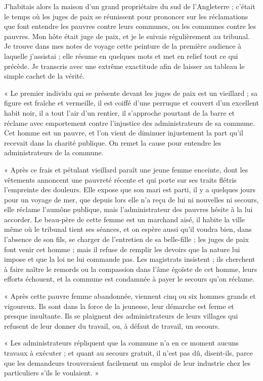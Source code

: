 \documentclass[french,twoside]{book} %
\newenvironment{quoteblock}%
  {\begin{quoting}}
  {\end{quoting}}
\newenvironment{quotebar}{%
    \def\FrameCommand{{\color{rubric!10!}\vrule width 0.5em} \hspace{0.9em}}%
    \def\OuterFrameSep{\itemsep} %
    \MakeFramed {\advance\hsize-\width \FrameRestore}
  }%
  {%
    \endMakeFramed
  }
\renewenvironment{quoteblock}%
  {%
    \savenotes
    \setstretch{0.9}
    \begin{quotebar}
  }
  {%
    \end{quotebar}
    \spewnotes
  }
\begin{document}
J'habitais alors la maison d’un grand propriétaire du sud de l’Angleterre ; c’était le temps où les juges de paix se réunissent pour prononcer sur les réclamations que font entendre les pauvres contre leurs communes, ou les communes contre les pauvres. Mon hôte était juge de paix, et je le suivais régulièrement au tribunal. Je trouve dans mes notes de voyage cette peinture de la première audience à laquelle j’assistai ; elle résume en quelques mots et met en relief tout ce qui précède. Je transcris avec une extrême exactitude afin de laisser au tableau le simple cachet de la vérité.\par

\begin{quoteblock}
\noindent « Le premier individu qui se présente devant les juges de paix est un vieillard ; sa figure est fraîche et vermeille, il est coiffé d’une perruque et couvert d’un excellent habit noir, il a tout l’air d’un rentier, il s’approche pourtant de la barre et réclame avec emportement contre l’injustice des administrateurs de sa commune. Cet homme est un pauvre, et l’on vient de diminuer injustement la part qu’il recevait dans la charité publique. On remet la cause pour entendre les administrateurs de la commune.\par
« Après ce frais et pétulant vieillard paraît une jeune femme enceinte, dont les vêtements annoncent une pauvreté récente et qui porte sur ses traits flétris l’empreinte des douleurs. Elle expose que son mari est parti, il y a quelques jours pour un voyage de mer, que depuis lors elle n’a reçu de lui ni nouvelles ni secours, elle réclame l’aumône publique, mais l’administrateur des pauvres hésite à la lui accorder. Le beau-père de cette femme est un marchand aisé, il habite la ville même où le tribunal tient ses séances, et on espère aussi qu’il voudra bien, dans l’absence de son fils, se charger de l’entretien de sa belle-fille ; les juges de paix font venir cet homme ; mais il refuse de remplir les devoirs que la nature lui impose et que la loi ne lui commande pas. Les magistrats insistent ; ils cherchent à faire naître le remords ou la compassion dans l’âme égoïste de cet homme, leurs efforts échouent, et la commune est condamnée à payer le secours qu’on réclame.\par
« Après cette pauvre femme abandonnée, viennent cinq ou six hommes grands et vigoureux. Ils sont dans la force de la jeunesse, leur démarche est ferme et presque insultante. Ils se plaignent des administrateurs de leurs villages qui refusent de leur donner du travail, ou, à défaut de travail, un secours.\par
« Les administrateurs répliquent que la commune n’a en ce moment aucuns travaux à exécuter ; et quant au secours gratuit, il n’est pas dû, disent-ils, parce que les demandeurs trouveraient facilement un emploi de leur industrie chez les particuliers s’ils le voulaient. »
\end{quoteblock}
\end{document}
